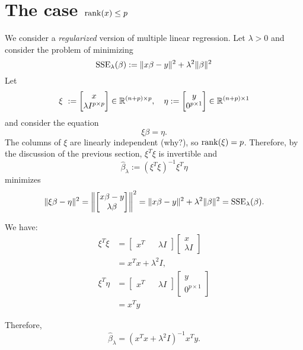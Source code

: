 \documentclass[12pt]{amsart}
\begin{document}
\section{The case $\operatorname{rank}(x)\leq p$}

We consider a \emph{regularized} version of multiple linear regression.
Let $\lambda > 0$ and consider the problem of minimizing 
\[
    \operatorname{SSE}_\lambda(\beta) := \|x\beta - y\|^2 + \lambda^2\|\beta\|^2
\]
Let
\[
    \xi\ := \begin{bmatrix}
        x\\\lambda I^{p\times p}
    \end{bmatrix}\in\mathbb{R}^{(n + p)\times p},
    \quad
    \eta := \begin{bmatrix}
        y\\0^{p\times 1}
    \end{bmatrix}\in\mathbb{R}^{(n+p)\times 1}
\]
and consider the equation
\[
    \xi\beta = \eta.
\]
The columns of $\xi$ are linearly independent (why?),
so $\operatorname{rank}(\xi)=p$.
Therefore, by the discussion of the previous section,
$\xi^T\xi$ is invertible and 
\[
    \hat{\beta}_\lambda := (\xi^T\xi)^{-1}\xi^T\eta
\]
minimizes
\[
    \|\xi\beta - \eta\|^2 = \left\|\begin{bmatrix}
        x\beta - y\\\lambda\beta
    \end{bmatrix}\right\|^2 = \|x\beta - y\|^2 + \lambda^2\|\beta\|^2
    = \operatorname{SSE}_\lambda(\beta).
\]

We have:
\begin{align*}
    \xi^T\xi &= \begin{bmatrix}
        x^T&&\lambda I
    \end{bmatrix}\begin{bmatrix}
        x\\\lambda I
    \end{bmatrix}\\
    &= x^Tx + \lambda^2I,\\
    \xi^T\eta &= \begin{bmatrix}
        x^T&&\lambda I
    \end{bmatrix}
    \begin{bmatrix}
        y\\0^{p\times 1}
    \end{bmatrix}\\
    &= x^Ty
\end{align*}

Therefore,
\[
    \hat\beta_\lambda = (x^Tx + \lambda^2I)^{-1}x^Ty.
\]
\end{document}
